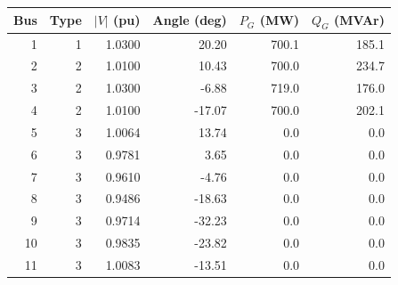 \begin{tabular}{rrrrrr}
\toprule
Bus & Type & $|V|$ (pu) & Angle (deg) & $P_G$ (MW) & $Q_G$ (MVAr)\\
\midrule
1 & 1 & 1.0300 & 20.20 & 700.1 & 185.1\\
2 & 2 & 1.0100 & 10.43 & 700.0 & 234.7\\
3 & 2 & 1.0300 & -6.88 & 719.0 & 176.0\\
4 & 2 & 1.0100 & -17.07 & 700.0 & 202.1\\
5 & 3 & 1.0064 & 13.74 & 0.0 & 0.0\\
6 & 3 & 0.9781 & 3.65 & 0.0 & 0.0\\
7 & 3 & 0.9610 & -4.76 & 0.0 & 0.0\\
8 & 3 & 0.9486 & -18.63 & 0.0 & 0.0\\
9 & 3 & 0.9714 & -32.23 & 0.0 & 0.0\\
10 & 3 & 0.9835 & -23.82 & 0.0 & 0.0\\
11 & 3 & 1.0083 & -13.51 & 0.0 & 0.0\\
\bottomrule
\end{tabular}
